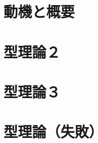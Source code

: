 \documentclass[dvipdfmx]{jsarticle}
\begin{document}
\section{動機と概要}


\newpage

\section{型理論２}

\newpage

\newpage


\section{型理論３}


\section{型理論（失敗）}

\newpage
\end{document}

